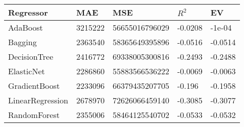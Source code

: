 \begin{tabular}{|p{3cm}p{1.5cm}p{2.5cm}p{1.2cm}p{1.2cm}|}
  \hline
Regressor & MAE & MSE & $R^2$ & EV \\ 
  \hline \hline
AdaBoost & 3215222 & 56655016796029 & -0.0208 & -1e-04 \\ 
  Bagging & 2363540 & 58365649395896 & -0.0516 & -0.0514 \\ 
  DecisionTree & 2416772 & 69338005300816 & -0.2493 & -0.2488 \\ 
  ElasticNet & 2286860 & 55883566536222 & -0.0069 & -0.0063 \\ 
  GradientBoost & 2233096 & 66379435207705 & -0.196 & -0.1958 \\ 
  LinearRegression & 2678970 & 72626066459140 & -0.3085 & -0.3077 \\ 
  RandomForest & 2355006 & 58464125540702 & -0.0533 & -0.0532 \\ 
   \hline
\end{tabular}
